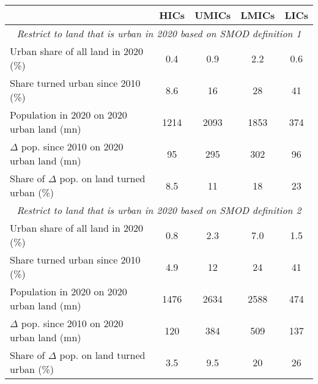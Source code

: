 
\begin{tabular}{lcccc}
\hline\hline
         & HICs & UMICs & LMICs & LICs \\
\hline
         \multicolumn{5}{c}{\it Restrict to land that is urban in 2020 based on SMOD definition 1}\\
\hline
     Urban share of all land in 2020 (\%)  & 0.4 & 0.9 & 2.2 & 0.6 \\
    Share turned urban since 2010 (\%)  & 8.6 & 16 & 28 & 41 \\
     Population in 2020 on 2020 urban land (mn)         & 1214 & 2093 & 1853 & 374 \\
     $\Delta$ pop. since 2010 on 2020 urban land (mn) & 95   & 295  & 302  & 96 \\
     Share of $\Delta$ pop. on land turned urban (\%) & 8.5 & 11 & 18 & 23 \\
    \hline
         \multicolumn{5}{c}{\it Restrict to land that is urban in 2020 based on SMOD definition 2}\\
\hline
    Urban share of all land in 2020 (\%)  & 0.8 & 2.3 & 7.0 & 1.5 \\
    Share turned urban since 2010 (\%)  & 4.9 & 12 & 24 & 41 \\
     Population in 2020 on 2020 urban land (mn)         & 1476 & 2634 & 2588 & 474 \\
     $\Delta$ pop. since 2010 on 2020 urban land (mn) & 120   & 384  & 509  & 137 \\
     Share of $\Delta$ pop. on land turned urban (\%) & 3.5 & 9.5 & 20 & 26\\
         \hline\hline
\end{tabular}
